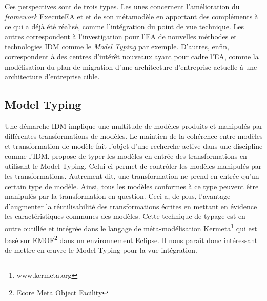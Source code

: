 Ces perspectives sont de trois types. Les unes concernent l'amélioration du \emph{framework} ExecuteEA et 
et de son métamodèle en apportant des compléments à ce qui a déjà été réalisé, comme l'intégration
du point de vue technique. Les autres correspondent à l'investigation pour l'EA
de nouvelles méthodes et technologies IDM comme le \emph{Model Typing} par exemple. D'autres, enfin,
correspondent à des centres d'intérêt nouveaux ayant pour cadre l'EA, comme la modélisation du plan de migration
d'une architecture d'entreprise actuelle à une architecture d'entreprise cible. 



\subsection{Model Typing}


Une démarche IDM implique une multitude de modèles produits et manipulés par différentes transformations de modèles. Le maintien de la cohérence entre modèles et transformation de modèle fait l'objet d'une recherche active dans une discipline comme l'IDM. \cite{steel2007model} propose de typer les modèles en entrée des transformations en utilisant le Model Typing. Celui-ci permet de contrôler les modèles manipulés par les transformations. Autrement dit, une transformation ne prend en entrée qu'un certain type de modèle. Ainsi, tous les modèles conformes à ce type peuvent être manipulés par la transformation en question. Ceci a, de plus, l'avantage d'augmenter la réutilisabilité des transformations écrites en mettant en évidence les caractéristiques communes des modèles. Cette technique de typage est en outre outillée et intégrée dans le langage de méta-modélisation Kermeta\footnote{www.kermeta.org} qui est basé sur EMOF\footnote{Ecore Meta Object Facility} dans un environnement Eclipse. Il nous paraît donc intéressant de mettre en œuvre le Model Typing pour la vue intégration.

